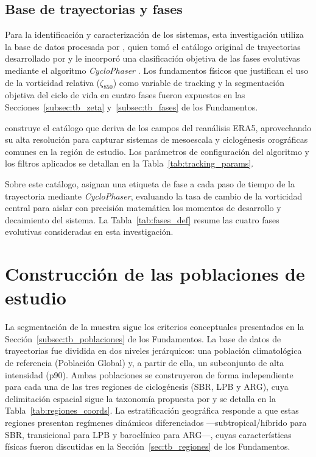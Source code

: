 \subsection{Base de trayectorias y fases}\label{sec:bd_ciclones}

Para la identificación y caracterización de los sistemas, esta investigación utiliza la base de datos procesada por \citet{coutodesouza2024new}, quien tomó el catálogo original de trayectorias desarrollado por \citet{gramcianinov2019properties} y le incorporó una clasificación objetiva de las fases evolutivas mediante el algoritmo \textit{CycloPhaser} \citep{deSouza2025CycloPhaser}. 
Los fundamentos físicos que justifican el uso de la vorticidad relativa ($\zeta_{850}$) como variable de tracking y la segmentación objetiva del ciclo de vida en cuatro fases fueron expuestos en las Secciones~\ref{subsec:tb_zeta} y~\ref{subsec:tb_fases} de los Fundamentos.

\citet{gramcianinov2019properties} construye el catálogo que deriva de los campos del reanálisis ERA5, aprovechando su alta resolución para capturar sistemas de mesoescala y ciclogénesis orográficas comunes en la región de estudio. Los parámetros de configuración del algoritmo y los filtros aplicados se detallan en la Tabla~\ref{tab:tracking_params}.



Sobre este catálogo, \citet{coutodesouza2024new} asignan una etiqueta de fase a cada paso de tiempo de la trayectoria mediante \textit{CycloPhaser}, evaluando la tasa de cambio de la vorticidad central para aislar con precisión matemática los momentos de desarrollo y decaimiento del sistema. La Tabla~\ref{tab:fases_def} resume las cuatro fases evolutivas consideradas en esta investigación.




\section{Construcción de las poblaciones de estudio}\label{sec:poblaciones_estudio}

La segmentación de la muestra sigue los criterios conceptuales presentados en la Sección~\ref{subsec:tb_poblaciones} de los Fundamentos. La base de datos de trayectorias fue dividida en dos niveles jerárquicos: una población climatológica de referencia (Población Global) y, a partir de ella, un subconjunto de alta intensidad (p90). Ambas poblaciones se construyeron de forma independiente para cada una de las tres regiones de ciclogénesis (SBR, LPB y ARG), cuya delimitación espacial sigue la taxonomía propuesta por \citet{gramcianinov2019properties} y se detalla en la Tabla~\ref{tab:regiones_coords}. La estratificación geográfica responde a que estas regiones presentan regímenes dinámicos diferenciados ---subtropical/híbrido para SBR, transicional para LPB y baroclínico para ARG---, cuyas características físicas fueron discutidas en la Sección~\ref{sec:tb_regiones} de los Fundamentos.


